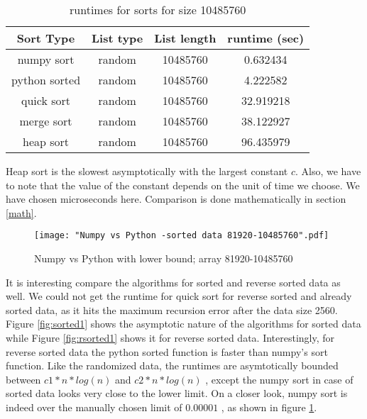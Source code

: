 \documentclass[sigconf,  natbib, screen]{acmart}
\begin{document}
\begin{table}[ht]
\begin{center}

\begin{tabular}{|c|c|c|c|} 
\hline
Sort Type & List type & List length & runtime (sec) \\
\hline
numpy sort &	random &	10485760 &	0.632434 \\
python sorted &	random &	10485760 &	4.222582 \\
quick sort &	random &	10485760 &	32.919218 \\
merge sort &	random &	10485760 &	38.122927 \\
heap sort &	random &	10485760 &	96.435979 \\
\hline
\end{tabular}
\end{center}
\caption{runtimes for sorts for size 10485760}
\label{tab:table1}
\end{table}

Heap sort is the slowest asymptotically with the largest constant $c$. Also, we have to note that the value of the constant depends on the unit of time we choose. We have chosen microseconds here. Comparison is done mathematically in section \ref{math}.

\begin{figure}[ht]
\texttt{[image: "Numpy vs Python -sorted data 81920-10485760".pdf]}
    \caption{Numpy vs Python with lower bound; array 81920-10485760 }
    \label{fig:numpyvspython}
\end{figure}


It is interesting compare the algorithms for sorted and reverse sorted data as well. We could not get the runtime for quick sort for reverse sorted and already sorted data, as it hits the maximum recursion error after the data size 2560. Figure \ref{fig:sorted1} shows the asymptotic nature of the algorithms for sorted data while Figure \ref{fig:rsorted1} shows it for reverse sorted data. Interestingly, for reverse sorted data the python sorted function is faster than numpy's sort function. Like the randomized data, the runtimes are asymtotically bounded between $c1*n*log(n)$  and $c2*n*log(n)$ , except the numpy sort in case of sorted data looks very close to the lower limit. On a closer look, numpy sort is indeed over the manually chosen limit of $0.00001$ , as shown in figure \ref{fig:numpyvspython}.
\end{document}
